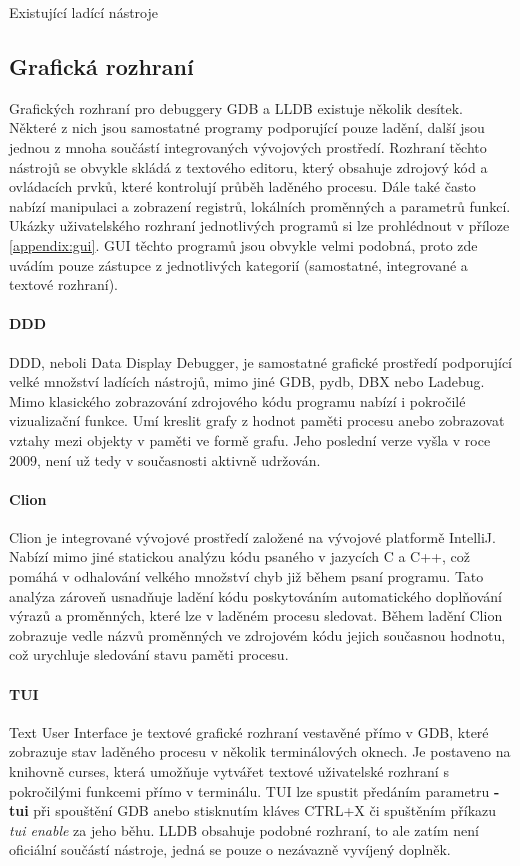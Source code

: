 \documentclass[czech,bachelor,male,python,dept460]{diploma}						%
\begin{document}
\begin{section}{Existující ladící nástroje}
	\subsection{Grafická rozhraní}
		Grafických rozhraní pro debuggery GDB a LLDB existuje několik desítek. Některé z nich jsou samostatné programy podporující pouze ladění, další jsou
		jednou z mnoha součástí integrovaných vývojových prostředí. Rozhraní těchto nástrojů se obvykle skládá z textového editoru, který obsahuje zdrojový kód a
		ovládacích prvků, které kontrolují průběh laděného procesu. Dále také často nabízí manipulaci a zobrazení registrů, lokálních proměnných a parametrů
		funkcí. Ukázky uživatelského rozhraní jednotlivých programů si lze prohlédnout v příloze \ref{appendix:gui}. GUI těchto programů jsou obvykle velmi
		podobná, proto zde uvádím pouze zástupce z jednotlivých kategorií (samostatné, integrované a textové rozhraní).

		\paragraph*{DDD}
			DDD, neboli Data Display Debugger, je samostatné grafické prostředí podporující velké množství ladících nástrojů, mimo jiné GDB, pydb, DBX nebo Ladebug.
			Mimo klasického zobrazování zdrojového kódu programu nabízí i pokročilé vizualizační funkce. Umí kreslit grafy z hodnot paměti procesu
			anebo zobrazovat vztahy mezi objekty v paměti ve formě grafu. Jeho poslední verze vyšla v roce 2009, není už tedy v současnosti aktivně udržován.
		\paragraph*{Clion}
		\label{ref:clion}
			Clion je integrované vývojové prostředí založené na vývojové platformě IntelliJ. Nabízí mimo jiné statickou analýzu kódu psaného v jazycích
			C a C++, což pomáhá v odhalování velkého množství chyb již během psaní programu. Tato analýza zároveň usnadňuje ladění kódu poskytováním
			automatického doplňování výrazů a proměnných, které lze v laděném procesu sledovat. Během ladění Clion zobrazuje vedle názvů proměnných
			ve zdrojovém kódu jejich současnou hodnotu, což urychluje sledování stavu paměti procesu.
		\paragraph*{TUI}
			Text User Interface je textové grafické rozhraní vestavěné přímo v GDB, které zobrazuje stav laděného procesu v několik terminálových oknech.
			Je postaveno na knihovně curses, která umožňuje vytvářet textové uživatelské rozhraní s pokročilými funkcemi přímo v terminálu.
			TUI lze spustit předáním parametru \textbf{-tui} při spouštění GDB anebo stisknutím kláves CTRL+X či spuštěním příkazu \emph{tui enable} za jeho běhu.
			LLDB obsahuje podobné rozhraní, to ale zatím není oficiální součástí nástroje, jedná se pouze o nezávazně vyvíjený doplněk.
\end{section}
\end{document}
